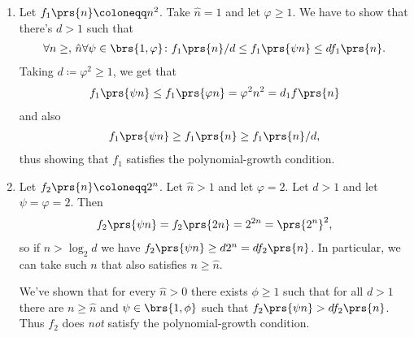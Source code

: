 \documentclass[oneside]{scrbook}
\theoremstyle{definition}
\begin{document}
\begin{exercise}
\begin{enumerate}
\item Let $f_1\prs{n} \coloneqq n^2$. Take $\hat{n} = 1$ and let $\varphi \geq 1$. We have to show that there's $d>1$ such that
\begin{align*}
\forall n \geq, \, \hat{n} \forall \psi \in \brs{1, \varphi} \colon f_1\prs{n} / d \leq f_1\prs{\psi n} \leq d f_1\prs{n} \text{.}
\end{align*}
Taking $d \coloneqq \varphi^2 \geq 1$, we get that
\begin{align*}
f_1\prs{\psi n} \leq f_1\prs{\varphi n} = \varphi^2 n^2 = d_1 f\prs{n}
\end{align*}
and also
\begin{align*}
f_1\prs{\psi n} \geq f_1\prs{n} \geq f_1\prs{n}/d \text{,}
\end{align*}
thus showing that $f_1$ satisfies the polynomial-growth condition.

\item Let $f_2\prs{n} \coloneqq 2^n$. Let $\hat{n} > 1$ and let $\varphi = 2$. Let $d > 1$ and let $\psi = \varphi = 2$. Then
\begin{align*}
f_2\prs{\psi n} = f_2\prs{2 n} = 2^{2n} = \prs{2^n}^2 \text{,}
\end{align*}
so if $n > \log_2 d$ we have $f_2\prs{\psi n} \geq d 2^n = d f_2\prs{n}$.
In particular, we can take such $n$ that also satisfies $n \geq \hat{n}$.

We've shown that for every $\hat{n} > 0$ there exists $\phi \geq 1$ such that for all $d > 1$ there are $n \geq \hat{n}$ and $\psi \in \brs{1, \phi}$ such that $f_2\prs{\psi n} > d f_2\prs{n}$. Thus $f_2$ does \emph{not} satisfy the polynomial-growth condition.
\end{enumerate}
\end{exercise}
\end{document}
